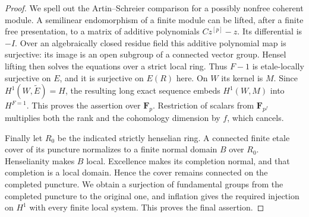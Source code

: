 \begin{proof}
We spell out the Artin--Schreier comparison for a possibly nonfree
coherent module. A semilinear endomorphism of a finite module can be
lifted, after a finite free presentation, to a matrix of additive
polynomials $Cz^{[p]}-z$. Its differential is $-I$. Over an algebraically
closed residue field this additive polynomial map is surjective: its
image is an open subgroup of a connected vector group. Hensel lifting
then solves the equations over a strict local ring. Thus $F-1$ is
etale-locally surjective on $E$, and it is surjective on $E(R)$ here.
On $W$ its kernel is $M$. Since $H^1(W,\widetilde E)=H$, the resulting
long exact sequence embeds $H^1(W,M)$ into $H^{F=1}$. This proves the
assertion over $\mathbf F_p$. Restriction of scalars from
$\mathbf F_{p^f}$ multiplies both the rank and the cohomology dimension
by $f$, which cancels.

Finally let $R_0$ be the indicated strictly henselian ring. A connected
finite etale cover of its puncture normalizes to a finite normal domain
$B$ over $R_0$. Henselianity makes $B$ local. Excellence makes its
completion normal, and that completion is a local domain. Hence the
cover remains connected on the completed puncture. We obtain a
surjection of fundamental groups from the completed puncture to the
original one, and inflation gives the required injection on $H^1$ with
every finite local system. This proves the final assertion.
\end{proof}

